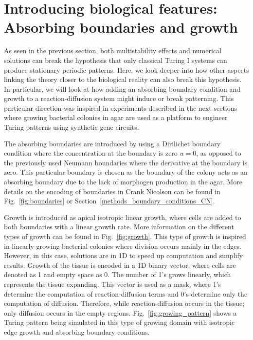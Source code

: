 \section{Introducing biological features: Absorbing boundaries and growth}
As seen in the previous section, both multistability effects and numerical solutions can break the hypothesis that only classical Turing I systems can produce stationary periodic patterns.
Here, we look deeper into how other aspects linking the theory closer to the biological reality can also break this hypothesis.
In particular, we will look at how adding an absorbing boundary condition and growth to a reaction-diffusion system might induce or break patterning.
This particular direction was inspired in experiments described in the next sections where growing bacterial colonies in agar are used as a platform to engineer Turing patterns using synthetic gene circuits.

The absorbing boundaries are introduced by using a Dirilichet boundary condition where the concentration at the boundary is zero $u=0$, as opposed to the previously used Neumann boundaries where the derivative at the boundary is zero.
This particular boundary is chosen as the boundary of the colony acts as an absorbing boundary due to the lack of morphogen production in the agar.
More details on the encoding of boundaries in Crank Nicolson can be found in Fig.~\ref{fig:boundaries} or Section~\ref{methods_boundary_conditions_CN}.

Growth is introduced as apical isotropic linear growth, where cells are added to both boundaries with a linear growth rate.
More information on the different types of growth can be found in Fig.~\ref{fig:growth}.
This type of growth is inspired in linearly growing bacterial colonies where division occurs mainly in the edges.
However, in this case, solutions are in 1D to speed up computation and simplify results.
Growth of the tissue is encoded in a 1D binary vector, where cells are denoted as 1 and empty space as 0.
The number of 1's grows linearly, which represents the tissue expanding.
This vector is used as a mask, where 1's determine the computation of reaction-diffusion terms and 0's determine only the computation of diffusion.
Therefore, while reaction-diffusion occurs in the tissue; only diffusion occurs in the empty regions.
Fig.~\ref{fig:growing_pattern} shows a Turing pattern being simulated in this type of growing domain with isotropic edge growth and absorbing boundary conditions.

